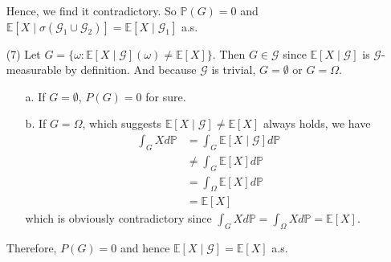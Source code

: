 \begin{enumerate}
    Hence, we find it contradictory. So $\mathbb{P}(G) = 0$ and $\mathbb{E}\left[X \mid \sigma\left(\mathcal{G}_{1} \cup \mathcal{G}_{2}\right)\right] = \mathbb{E}\left[X \mid \mathcal{G}_{1}\right]$ a.s.

    \item[(7)] Let $G = \{\omega: \mathbb{E}[X \mid \mathcal{G}] (\omega) \neq \mathbb{E}[X] \}$.
    Then $G \in \mathcal{G}$ since $\mathbb{E}[X \mid \mathcal{G}]$ is $\mathcal{G}$-measurable by definition.
    And because $\mathcal{G}$ is trivial, $G = \emptyset$ or $G = \Omega$.
    \begin{enumerate}
        \item[a.] If $G = \emptyset$, $P(G) = 0$ for sure.
        \item[b.] If $G = \Omega$, which suggests $\mathbb{E}[X \mid \mathcal{G}] \neq \mathbb{E}[X]$ always holds, we have
        \begin{equation}
            \begin{split}
                \int_{G} X d \mathbb{P}
                &= \int_{G} \mathbb{E}[X \mid \mathcal{G}] d \mathbb{P} \\
                &\neq \int_{G} \mathbb{E}[X] d \mathbb{P} \\
                &= \int_{\Omega} \mathbb{E}[X] d \mathbb{P} \\
                &= \mathbb{E}[X]
            \end{split}
        \end{equation}
        which is obviously contradictory since $\int_{G} X d \mathbb{P} = \int_{\Omega} X d \mathbb{P} = \mathbb{E}[X]$.
    \end{enumerate}
    Therefore, $P(G) = 0$ and hence $\mathbb{E}[X \mid \mathcal{G}] = \mathbb{E}[X]$ a.s.
\end{enumerate}
\fi